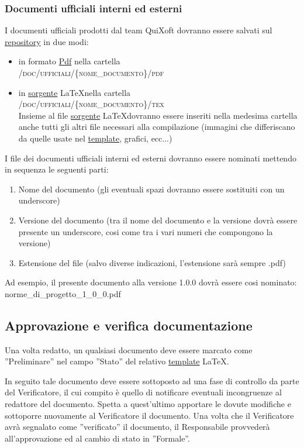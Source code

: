 \documentclass[11pt,a4paper]{article}
\begin{document}
\subsubsection{Documenti ufficiali interni ed esterni}
I documenti ufficiali prodotti dal team QuiXoft dovranno essere salvati sul \underline{repository} in due modi:
\begin{itemize}
	\item in formato \underline{Pdf} nella cartella 
\\ \textsc{/doc/ufficiali/\{nome\_documento\}/pdf}
	\item in \underline{sorgente} \LaTeX \space nella cartella 
\\ \textsc{/doc/ufficiali/\{nome\_documento\}/tex}
\\ Insieme al file \underline{sorgente} \LaTeX \space dovranno essere inseriti nella medesima cartella anche tutti gli altri file necessari alla compilazione (immagini che differiscano da quelle usate nel \underline{template}, grafici, ecc...)
\end{itemize}

I file dei documenti ufficiali interni ed esterni dovranno essere nominati mettendo in sequenza le seguenti parti:
\begin{enumerate}
 \item Nome del documento (gli eventuali spazi dovranno essere sostituiti con un underscore)
 \item Versione del documento (tra il nome del documento e la versione dovrà essere presente un underscore, cosi come tra i vari numeri che compongono la versione)
 \item Estensione del file (salvo diverse indicazioni, l'estensione sarà sempre .pdf)
\end{enumerate}
Ad esempio, il presente documento alla versione 1.0.0 dovrà essere cosi nominato: norme\_di\_progetto\_1\_0\_0.pdf


\subsection{Approvazione e verifica documentazione}
Una volta redatto, un qualsiasi documento deve essere marcato come ''Preliminare'' nel campo ''Stato'' del relativo \underline{template} \LaTeX.

In seguito tale documento deve essere sottoposto ad una fase di controllo da parte del Verificatore, il cui compito è quello di notificare eventuali incongruenze al redattore del documento.
Spetta a quest'ultimo apportare le dovute modifiche e sottoporre nuovamente al Verificatore il documento.
Una volta che il Verificatore avrà segnalato come ''verificato'' il documento, il Responsabile provvederà all'approvazione ed al cambio di stato in ''Formale''.
\end{document}
